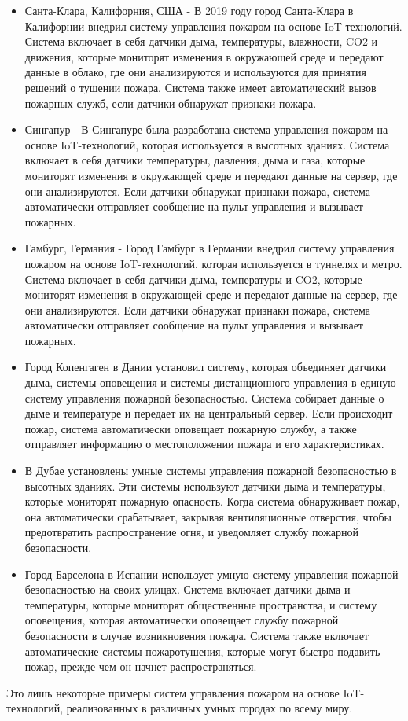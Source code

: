 \begin{multicols}{2}
\begin{itemize}
\item
  Санта-Клара, Калифорния, США - В 2019 году город Санта-Клара в
  Калифорнии внедрил систему управления пожаром на основе
  IoT-технологий. Система включает в себя датчики дыма, температуры,
  влажности, CO2 и движения, которые мониторят изменения в окружающей
  среде и передают данные в облако, где они анализируются и используются
  для принятия решений о тушении пожара. Система также имеет
  автоматический вызов пожарных служб, если датчики обнаружат признаки
  пожара.
\item
  Сингапур - В Сингапуре была разработана система управления пожаром на
  основе IoT-технологий, которая используется в высотных зданиях.
  Система включает в себя датчики температуры, давления, дыма и газа,
  которые мониторят изменения в окружающей среде и передают данные на
  сервер, где они анализируются. Если датчики обнаружат признаки пожара,
  система автоматически отправляет сообщение на пульт управления и
  вызывает пожарных.
\item
  Гамбург, Германия - Город Гамбург в Германии внедрил систему
  управления пожаром на основе IoT-технологий, которая используется в
  туннелях и метро. Система включает в себя датчики дыма, температуры и
  CO2, которые мониторят изменения в окружающей среде и передают данные
  на сервер, где они анализируются. Если датчики обнаружат признаки
  пожара, система автоматически отправляет сообщение на пульт управления
  и вызывает пожарных.
\item
  Город Копенгаген в Дании установил систему, которая объединяет датчики
  дыма, системы оповещения и системы дистанционного управления в единую
  систему управления пожарной безопасностью. Система собирает данные о
  дыме и температуре и передает их на центральный сервер. Если
  происходит пожар, система автоматически оповещает пожарную службу, а
  также отправляет информацию о местоположении пожара и его
  характеристиках.
\item
  В Дубае установлены умные системы управления пожарной безопасностью в
  высотных зданиях. Эти системы используют датчики дыма и температуры,
  которые мониторят пожарную опасность. Когда система обнаруживает
  пожар, она автоматически срабатывает, закрывая вентиляционные
  отверстия, чтобы предотвратить распространение огня, и уведомляет
  службу пожарной безопасности.
\item
  Город Барселона в Испании использует умную систему управления пожарной
  безопасностью на своих улицах. Система включает датчики дыма и
  температуры, которые мониторят общественные пространства, и систему
  оповещения, которая автоматически оповещает службу пожарной
  безопасности в случае возникновения пожара. Система также включает
  автоматические системы пожаротушения, которые могут быстро подавить
  пожар, прежде чем он начнет распространяться.
\end{itemize}

Это лишь некоторые примеры систем управления пожаром на основе
IoT-технологий, реализованных в различных умных городах по всему миру.

\end{multicols}

